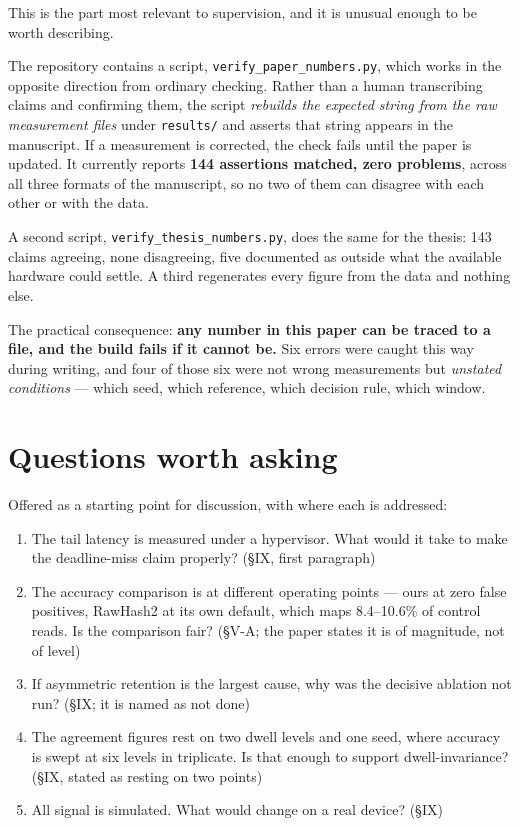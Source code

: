 \documentclass[11pt,a4paper]{article}
\begin{document}
This is the part most relevant to supervision, and it is unusual enough to be worth
describing.

The repository contains a script, \texttt{verify\_paper\_numbers.py}, which works in the
opposite direction from ordinary checking. Rather than a human transcribing claims and
confirming them, the script \emph{rebuilds the expected string from the raw measurement
files} under \texttt{results/} and asserts that string appears in the manuscript. If a
measurement is corrected, the check fails until the paper is updated. It currently reports
\textbf{144 assertions matched, zero problems}, across all three formats of the manuscript,
so no two of them can disagree with each other or with the data.

A second script, \texttt{verify\_thesis\_numbers.py}, does the same for the thesis: 143 claims
agreeing, none disagreeing, five documented as outside what the available hardware could
settle. A third regenerates every figure from the data and nothing else.

The practical consequence: \textbf{any number in this paper can be traced to a file, and the
build fails if it cannot be.} Six errors were caught this way during writing, and four of
those six were not wrong measurements but \emph{unstated conditions} --- which seed, which
reference, which decision rule, which window.

\section{Questions worth asking}

Offered as a starting point for discussion, with where each is addressed:

\begin{enumerate}
\item The tail latency is measured under a hypervisor. What would it take to make the
      deadline-miss claim properly? \hfill (§IX, first paragraph)
\item The accuracy comparison is at different operating points --- ours at zero false
      positives, RawHash2 at its own default, which maps 8.4--10.6\% of control reads. Is
      the comparison fair? \hfill (§V-A; the paper states it is of magnitude, not of level)
\item If asymmetric retention is the largest cause, why was the decisive ablation not run?
      \hfill (§IX; it is named as not done)
\item The agreement figures rest on two dwell levels and one seed, where accuracy is swept at
      six levels in triplicate. Is that enough to support dwell-invariance?
      \hfill (§IX, stated as resting on two points)
\item All signal is simulated. What would change on a real device? \hfill (§IX)
\end{enumerate}
\end{document}
